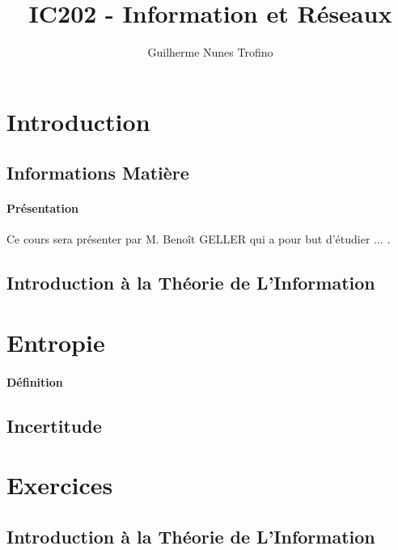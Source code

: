 \documentclass{article}
\title{IC202 - Information et Réseaux}
\author{Guilherme Nunes Trofino}
\begin{document}
\maketitle

\newpage\tableofcontents

\section{Introduction}



\subsection{Informations Matière}
\paragraph{Présentation}Ce cours sera présenter par M. Benoît GELLER qui a pour but d'étudier ... .

\subsection{Introduction à la Théorie de L'Information}

\section{Entropie}
\paragraph{Définition}

\subsection{Incertitude}

\section{Exercices}

\subsection{Introduction à la Théorie de L'Information}
\end{document}
